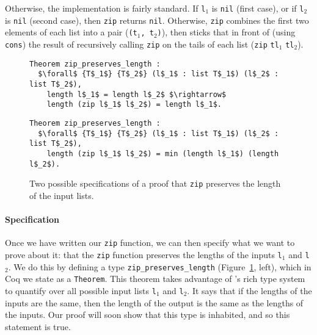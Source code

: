 Otherwise, the implementation is fairly standard.
If \lstinline{l}$_1$ is \lstinline{nil} (first case),
or if \lstinline{l}$_2$ is \lstinline{nil} (second case), 
then \lstinline{zip} returns \lstinline{nil}.
Otherwise,
\lstinline{zip} combines the first two elements of each list into a pair (\lstinline{(t}$_1$\lstinline{, t}$_2$\lstinline{)}),
then sticks that in front of (using \lstinline{cons}) the result of recursively calling \lstinline{zip} on the tails of each list
(\lstinline{zip} \lstinline{tl}$_1$ \lstinline{tl}$_2$). %

\begin{figure}
\begin{minipage}{0.49\textwidth}
\begin{lstlisting}
Theorem zip_preserves_length :
  $\forall$ {T$_1$} {T$_2$} (l$_1$ : list T$_1$) (l$_2$ : list T$_2$),
    length l$_1$ = length l$_2$ $\rightarrow$
    length (zip l$_1$ l$_2$) = length l$_1$.
\end{lstlisting}
\end{minipage}
\hfill
\begin{minipage}{0.49\textwidth}
\begin{lstlisting}
Theorem zip_preserves_length :
  $\forall$ {T$_1$} {T$_2$} (l$_1$ : list T$_1$) (l$_2$ : list T$_2$),
    length (zip l$_1$ l$_2$) = min (length l$_1$) (length l$_2$).
\end{lstlisting}
\end{minipage}
\caption{Two possible specifications of a proof that \lstinline{zip} preserves the length of the input lists.}
\label{fig:zip-pres}
\end{figure}

\paragraph{Specification} Once we have written our \lstinline{zip} function, we can then specify what we 
want to prove about it: that the \lstinline{zip} function preserves the lengths of the inputs \lstinline{l}$_1$ and \lstinline{l}$_2$.
We do this by defining a type \lstinline{zip_preserves_length} (Figure~\ref{fig:zip-pres}, left), which in Coq we state as a \lstinline{Theorem}.
This theorem takes advantage of 's rich type system to quantify over all possible input lists \lstinline{l}$_1$ and \lstinline{l}$_2$.
It says that if the lengths of the inputs are the same, then the length of the output is the same as the lengths of the inputs.
Our proof will soon show that this type is inhabited, and so this statement is true.

